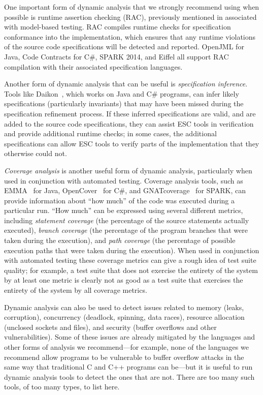 One important form of dynamic analysis that we strongly recommend
using when possible is runtime assertion checking (RAC), previously
mentioned in associated with model-based testing. RAC compiles runtime
checks for specification conformance into the implementation, which
ensures that any runtime violations of the source code specifications
will be detected and reported. OpenJML for Java, Code Contracts for
C\#, SPARK 2014, and Eiffel all support RAC compilation with their
associated specification languages.

Another form of dynamic analysis that can be useful is
\emph{specification inference}. Tools like Daikon~\cite{Ernst2007},
which works on Java and C\# programs, can infer likely specifications
(particularly invariants) that may have been missed during the
specification refinement process. If these inferred specifications are
valid, and are added to the source code specifications, they can
assist ESC tools in verification and provide additional runtime
checks; in some cases, the additional specifications can allow ESC
tools to verify parts of the implementation that they otherwise could
not.

\emph{Coverage analysis} is another useful form of dynamic analysis,
particularly when used in conjunction with automated testing. Coverage
analysis tools, such as EMMA~\cite{EMMA} for Java,
OpenCover~\cite{OpenCover} for C\#, and
GNATcoverage~\cite{GNATcoverage} for SPARK, can provide information
about ``how much'' of the code was executed during a particular
run. ``How much'' can be expressed using several different metrics,
including \emph{statement coverage} (the percentage of the source
statements actually executed), \emph{branch coverage} (the percentage
of the program branches that were taken during the execution), and
\emph{path coverage} (the percentage of possible execution paths that
were taken during the execution). When used in conjunction with
automated testing these coverage metrics can give a rough idea of test
suite quality; for example, a test suite that does not exercise the
entirety of the system by at least one metric is clearly not as good
as a test suite that exercises the entirety of the system by all
coverage metrics. 

Dynamic analysis can also be used to detect issues related to memory
(leaks, corruption), concurrency (deadlock, spinning, data races),
resource allocation (unclosed sockets and files), and security (buffer
overflows and other vulnerabilities). Some of these issues are already
mitigated by the languages and other forms of analysis we
recommend---for example, none of the languages we recommend allow
programs to be vulnerable to buffer overflow attacks in the same way
that traditional C and C++ programs can be---but it is useful to run
dynamic analysis tools to detect the ones that are not. There are too
many such tools, of too many types, to list here.

